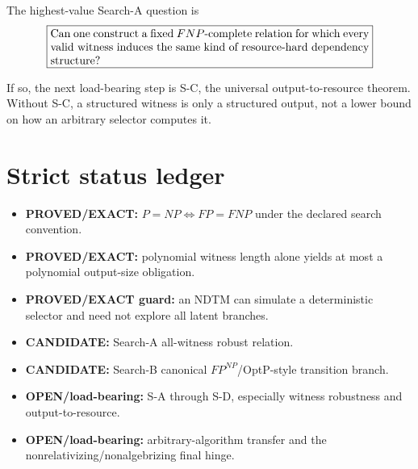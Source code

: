 \documentclass[11pt]{article}
\begin{document}
The highest-value Search-A question is
\[
\boxed{
\begin{minipage}{0.82\linewidth}
Can one construct a fixed \(FNP\)-complete relation for which every valid witness induces the same
kind of resource-hard dependency structure?
\end{minipage}
}
\]

If so, the next load-bearing step is S-C, the universal output-to-resource theorem. Without S-C, a
structured witness is only a structured output, not a lower bound on how an arbitrary selector
computes it.

\section{Strict status ledger}

\begin{itemize}
\item[] \textbf{PROVED/EXACT:} \(P=NP\iff FP=FNP\) under the declared search convention.
\item[] \textbf{PROVED/EXACT:} polynomial witness length alone yields at most a polynomial output-size
obligation.
\item[] \textbf{PROVED/EXACT guard:} an NDTM can simulate a deterministic selector and need not explore
all latent branches.
\item[] \textbf{CANDIDATE:} Search-A all-witness robust relation.
\item[] \textbf{CANDIDATE:} Search-B canonical \(FP^{NP}\)/OptP-style transition branch.
\item[] \textbf{OPEN/load-bearing:} S-A through S-D, especially witness robustness and
output-to-resource.
\item[] \textbf{OPEN/load-bearing:} arbitrary-algorithm transfer and the
nonrelativizing/nonalgebrizing final hinge.
\end{itemize}



\end{document}
